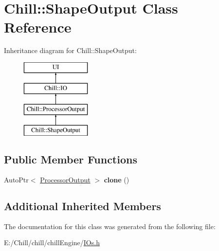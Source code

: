 \hypertarget{class_chill_1_1_shape_output}{}\section{Chill\+:\+:Shape\+Output Class Reference}
\label{class_chill_1_1_shape_output}
Inheritance diagram for Chill\+:\+:Shape\+Output\+:\begin{figure}[H]
\begin{center}
\leavevmode
\includegraphics[height=4.000000cm]{class_chill_1_1_shape_output}
\end{center}
\end{figure}
\subsection*{Public Member Functions}
\begin{DoxyCompactItemize}
\item 
\mbox{\label{class_chill_1_1_shape_output_a476d073fcfa8e39483253c6dd6f9dae1}} 
Auto\+Ptr$<$ \mbox{\hyperlink{class_chill_1_1_processor_output}{Processor\+Output}} $>$ {\bfseries clone} ()
\end{DoxyCompactItemize}
\subsection*{Additional Inherited Members}


The documentation for this class was generated from the following file\+:\begin{DoxyCompactItemize}
\item 
E\+:/\+Chill/chill/chill\+Engine/\mbox{\hyperlink{_i_os_8h}{I\+Os.\+h}}\end{DoxyCompactItemize}
